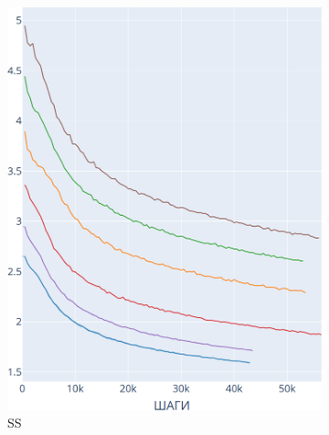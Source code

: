\documentclass{spbau-diploma}
\begin{document}
\begin{figure}[h]
\begin{subfigure}{.3\textwidth}
		\includegraphics[scale=0.2]{BooksCorpus_SS}
		\caption{SS}
		\label{fig:BooksCorpus_graphs_SS}
	\end{subfigure}
	\begin{subfigure}{.3\textwidth}
		\centering

\end{subfigure}
\end{figure}
\end{document}
